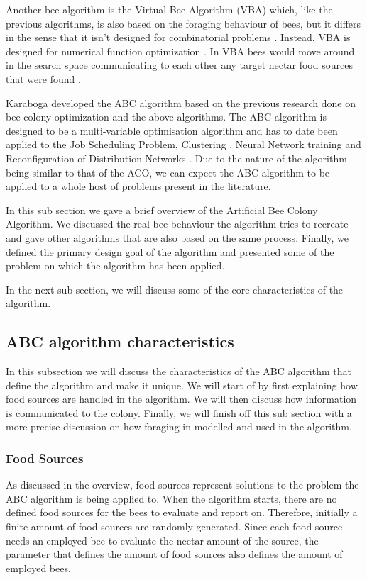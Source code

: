 Another bee algorithm is the Virtual Bee Algorithm (VBA) which, like the previous algorithms, is also based on the foraging behaviour of bees, but it differs in the sense that it isn't designed for combinatorial problems \cite{ABCNumericalOptimization}. Instead, VBA is designed for numerical function optimization \cite{ABCNumericalOptimization}. In VBA bees would move around in the search space communicating to each other any target nectar food sources that were found \cite{ABCNumericalOptimization}.

Karaboga developed the ABC algorithm based on the previous research done on bee colony optimization and the above algorithms. The ABC algorithm is designed to be a multi-variable optimisation algorithm and has to date been applied to the Job Scheduling Problem, Clustering \cite{HybridABCClustering}, Neural Network training and Reconfiguration of Distribution Networks \cite{ABCReconfigDistro}. Due to the nature of the algorithm being similar to that of the ACO, we can expect the ABC algorithm to be applied to a whole host of problems present in the literature.

In this sub section we gave a brief overview of the Artificial Bee Colony Algorithm. We discussed the real bee behaviour the algorithm tries to recreate and  gave other algorithms that are also based on the same process. Finally, we defined the primary design goal of the algorithm and presented some of the problem on which the algorithm has been applied.

In the next sub section, we will discuss some of the core characteristics of the algorithm.
\subsection{ABC algorithm characteristics}
In this subsection we will discuss the characteristics of the ABC algorithm that define the algorithm and make it unique. We will start of by first explaining how food sources are handled in the algorithm. We will then discuss how information is communicated to the colony. Finally, we will finish off this sub section with a more precise discussion on how foraging in modelled and used in the algorithm.
\subsubsection{Food Sources}
\label{sec:foodsources}
As discussed in the overview, food sources represent solutions to the problem the ABC algorithm is being applied to. When the algorithm starts, there are no defined food sources for the bees to evaluate and report on. Therefore, initially a finite amount of food sources are randomly generated. Since each food source needs an employed bee to evaluate the nectar amount of the source, the parameter that defines the amount of food sources also defines the amount of employed bees.

